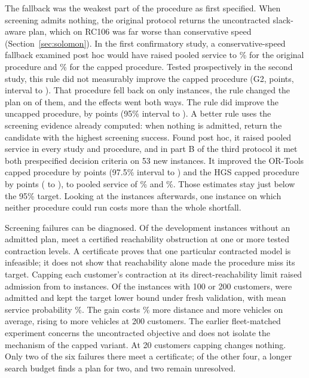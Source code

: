 \documentclass[11pt,a4paper]{article}
\begin{document}
The fallback was the weakest part of the procedure as first specified. When
screening admits nothing,
the original protocol returns the uncontracted slack-aware plan, which on RC106
was far worse than conservative speed (Section~\ref{sec:solomon}). In the first
confirmatory study, a conservative-speed fallback examined post hoc would have
raised pooled service to \PostHocP\% for the original procedure and \PostHocK\%
for the capped procedure. Tested prospectively in the second study, this rule did
not measurably improve the capped procedure (G2, \CtwoGTwoMean{} points, interval
\CtwoGTwoLo{} to \CtwoGTwoHi{}). That procedure fell back on only
\CtwoORTKFallbacks{} instances, the rule changed the plan on
\CtwoFallbacksChanged{} of them, and the effects went both ways. The rule did
improve the uncapped procedure, by \CtwoGThreeMean{} points (95\% interval
\CtwoGThreeLo{} to \CtwoGThreeHi{}). A better rule uses the screening evidence
already computed: when nothing is admitted, return the candidate with the highest
screening success. Found post hoc, it raised pooled service in every study and
procedure, and in part B of the third protocol it met both prespecified decision
criteria on 53 new instances. It improved the OR-Tools capped procedure by
\PbFOne{} points (97.5\% interval \PbFOneLo{} to \PbFOneHi{}) and the HGS capped
procedure by \PbFTwo{} points (\PbFTwoLo{} to \PbFTwoHi{}), to pooled service of
\PbFThree\% and \PbFFour\%. Those estimates stay just below the 95\% target.
Looking at the instances afterwards, one instance on which neither procedure
could run costs more than the whole shortfall.

Screening failures can be diagnosed. Of the \FailureCount{} development instances
without an admitted plan, \CertifiedFailures{} meet a certified reachability
obstruction at one or more tested contraction levels. A certificate proves that
one particular contracted model is infeasible; it does not show that reachability
alone made the procedure miss its target. Capping each customer's contraction at
its direct-reachability limit raised admission from \OriginalSelected{} to
\CappedSelected{} instances. Of the instances with 100 or 200 customers,
\CappedLargeSelected{} were admitted and \CappedLargeRetained{} kept the target
lower bound under fresh validation, with mean service probability
\CappedLargeRange\%. The gain costs \CappedDistanceCost\% more distance and
\CappedFleetCost{} more vehicles on average, rising to \CappedFleetLarge{} more
vehicles at 200 customers. The earlier fleet-matched experiment concerns the
uncontracted objective and does not isolate the mechanism of the capped variant.
At 20 customers capping changes nothing. Only two of the six failures there meet
a certificate; of the other four, a longer search budget finds a plan for two,
and two remain unresolved.
\end{document}
